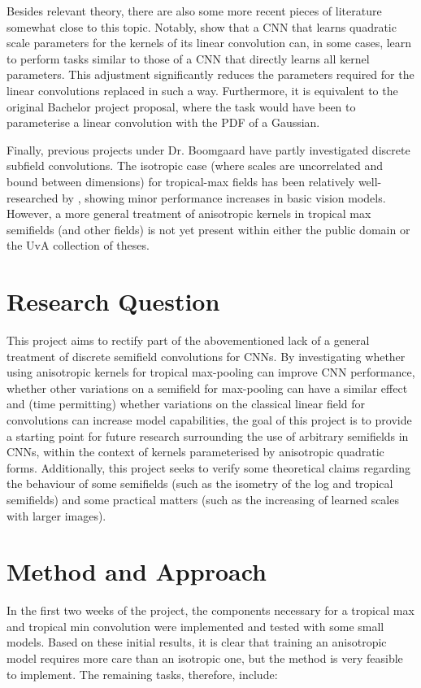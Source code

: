 \documentclass[11pt]{article} %
\begin{document}
Besides relevant theory, there are also some more recent pieces of literature somewhat close to this topic. Notably, \cite{qlin1, qlin2} show that a CNN that learns quadratic scale parameters for the kernels of its linear convolution can, in some cases, learn to perform tasks similar to those of a CNN that directly learns all kernel parameters. This adjustment significantly reduces the parameters required for the linear convolutions replaced in such a way. Furthermore, it is equivalent to the original Bachelor project proposal, where the task would have been to parameterise a linear convolution with the PDF of a Gaussian. 

Finally, previous projects under Dr. Boomgaard have partly investigated discrete subfield convolutions. The isotropic case (where scales are uncorrelated and bound between dimensions) for tropical-max fields has been relatively well-researched by \cite{thierrybsc, koenbsc}, showing minor performance increases in basic vision models. However, a more general treatment of anisotropic kernels in tropical max semifields (and other fields) is not yet present within either the public domain or the UvA collection of theses. 

\section{Research Question}
This project aims to rectify part of the abovementioned lack of a general treatment of discrete semifield convolutions for CNNs. By investigating whether using anisotropic kernels for tropical max-pooling can improve CNN performance, whether other variations on a semifield for max-pooling can have a similar effect and (time permitting) whether variations on the classical linear field for convolutions can increase model capabilities, the goal of this project is to provide a starting point for future research surrounding the use of arbitrary semifields in CNNs, within the context of kernels parameterised by anisotropic quadratic forms. Additionally, this project seeks to verify some theoretical claims regarding the behaviour of some semifields (such as the isometry of the log and tropical semifields) and some practical matters (such as the increasing of learned scales with larger images).

\section{Method and Approach}
In the first two weeks of the project, the components necessary for a tropical max and tropical min convolution were implemented and tested with some small models. Based on these initial results, it is clear that training an anisotropic model requires more care than an isotropic one, but the method is very feasible to implement. The remaining tasks, therefore, include:
\end{document}

